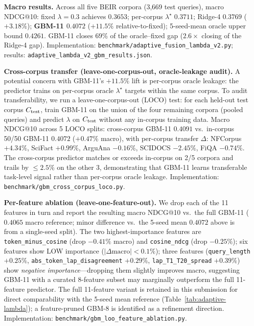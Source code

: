 \documentclass[review,1p]{elsarticle}
\begin{document}
\textbf{Macro results.} Across all five BEIR corpora (3{,}669 test queries), macro NDCG@10: fixed $\lambda=0.3$ achieves $0.3653$; per-corpus $\lambda^\star$ $0.3711$; Ridge-4 $0.3769$ ($+3.18\%$); \textbf{GBM-11 $\mathbf{0.4072}$} ($\mathbf{+11.5\%}$ relative-to-fixed); 5-seed-mean oracle upper bound $0.4261$. GBM-11 closes $69\%$ of the oracle--fixed gap ($2.6\times$ closing of the Ridge-4 gap). Implementation: \texttt{benchmark/adaptive\_fusion\_lambda\_v2.py}; results: \texttt{adaptive\_lambda\_v2\_gbm\_results.json}.

\textbf{Cross-corpus transfer (leave-one-corpus-out, oracle-leakage audit).} A potential concern with GBM-11's $+11.5\%$ lift is per-corpus oracle leakage: the predictor trains on per-corpus oracle $\lambda^\star$ targets within the same corpus. To audit transferability, we run a leave-one-corpus-out (LOCO) test: for each held-out test corpus $C_{\rm test}$, train GBM-11 on the union of the four remaining corpora (pooled queries) and predict $\lambda$ on $C_{\rm test}$ without any in-corpus training data. Macro NDCG@10 across 5 LOCO splits: cross-corpus GBM-11 \textbf{$0.4091$} vs.\ in-corpus 50/50 GBM-11 $0.4072$ ($+0.47\%$ macro), with per-corpus transfer $\Delta$: NFCorpus $+4.34\%$, SciFact $+0.99\%$, ArguAna $-0.16\%$, SCIDOCS $-2.45\%$, FiQA $-0.74\%$. The cross-corpus predictor matches or exceeds in-corpus on 2/5 corpora and trails by $\le 2.5\%$ on the other 3, demonstrating that GBM-11 learns transferable task-level signal rather than per-corpus oracle leakage. Implementation: \texttt{benchmark/gbm\_cross\_corpus\_loco.py}.

\textbf{Per-feature ablation (leave-one-feature-out).} We drop each of the 11 features in turn and report the resulting macro NDCG@10 vs.\ the full GBM-11 ($0.4065$ macro reference; minor difference vs.\ the 5-seed mean $0.4072$ above is from a single-seed split). The two highest-importance features are \texttt{token\_minus\_cosine} (drop $-0.41\%$ macro) and \texttt{cosine\_ndcg} (drop $-0.25\%$); six features show LOW importance ($|\Delta\text{macro}| < 0.1\%$); three features (\texttt{query\_length} $+0.25\%$, \texttt{abs\_token\_lap\_disagreement} $+0.29\%$, \texttt{lap\_T1\_T20\_spread} $+0.39\%$) show \emph{negative importance}---dropping them slightly improves macro, suggesting GBM-11 with a curated 8-feature subset may marginally outperform the full 11-feature predictor. The full 11-feature variant is retained in this submission for direct comparability with the 5-seed mean reference (Table~\ref{tab:adaptive-lambda}); a feature-pruned GBM-8 is identified as a refinement direction. Implementation: \texttt{benchmark/gbm\_loo\_feature\_ablation.py}.
\end{document}
